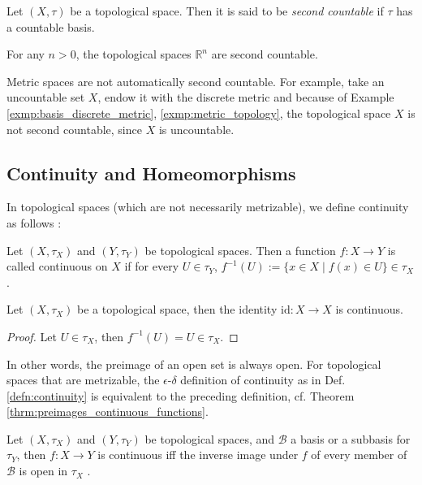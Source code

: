 \begin{defn}
	Let $(X, \tau)$ be a topological space. Then it is said to be \textit{second countable} if $\tau$ has a countable basis. 
\end{defn}

\begin{exmp}
	For any $n > 0$, the topological spaces $\mathbb R^n$ are second countable. 
\end{exmp}

\begin{remark}
	Metric spaces are not automatically second countable. For example, take an uncountable set $X$, endow it with the discrete metric and because of Example \ref{exmp:basis_discrete_metric}, \ref{exmp:metric_topology},  the topological space $X$ is not second countable, since $X$ is uncountable. 
\end{remark}	

\subsection{Continuity and Homeomorphisms}

In topological spaces (which are not necessarily metrizable), we define continuity as follows \cite{topology-singh}:

\begin{defn}\label{defn:continuity_topological_spaces}
	Let $(X, \tau_X)$ and $(Y, \tau_Y)$ be topological spaces. Then a function $f: X \to Y$ is called continuous on $X$ if for every $U\in \tau_Y$, $f^{-1}(U) := \{ x\in X \mid f(x)\in U \} \in \tau_X$.
\end{defn}

\begin{exmp}
	Let $(X, \tau_X)$ be a topological space, then the identity $\text{id}: X\to X$ is continuous.
\end{exmp}

\begin{proof}
	Let $U\in \tau_X$, then $f^{-1}(U) = U\in\tau_X$.
\end{proof}

\begin{remark}
	In other words, the preimage of an open set is always open. For topological spaces that are metrizable, the $\epsilon$-$\delta$ definition of continuity as in Def. \ref{defn:continuity} is equivalent to the preceding definition, cf. Theorem \ref{thrm:preimages_continuous_functions}.
\end{remark}

\begin{theorem}\label{thrm:continuity_sub_basis}
	Let $(X, \tau_X)$ and $(Y, \tau_Y)$ be topological spaces, and $\mathscr B$ a basis or a subbasis for $\tau_Y$, then $f: X\to Y$ is continuous iff the inverse image under $f$ of every member of $\mathscr B$ is open in $\tau_X$ \cite{topology-singh}. 
\end{theorem}

